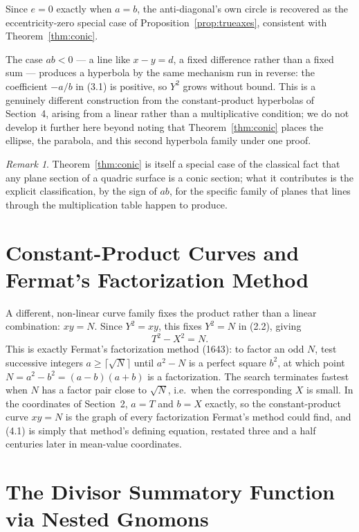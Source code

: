 \documentclass[11pt]{amsart}
\theoremstyle{remark}
\newtheorem*{remark}{Remark}
\begin{document}
Since $e=0$ exactly when $a=b$, the anti-diagonal's own circle is recovered as the eccentricity-zero special case of Proposition~\ref{prop:trueaxes}, consistent with Theorem~\ref{thm:conic}.

The case $ab<0$ --- a line like $x-y=d$, a fixed difference rather than a fixed sum --- produces a hyperbola by the same mechanism run in reverse: the coefficient $-a/b$ in (3.1) is positive, so $Y^2$ grows without bound. This is a genuinely different construction from the constant-product hyperbolas of Section~4, arising from a linear rather than a multiplicative condition; we do not develop it further here beyond noting that Theorem~\ref{thm:conic} places the ellipse, the parabola, and this second hyperbola family under one proof.

\begin{remark}
Theorem~\ref{thm:conic} is itself a special case of the classical fact that any plane section of a quadric surface is a conic section; what it contributes is the explicit classification, by the sign of $ab$, for the specific family of planes that lines through the multiplication table happen to produce.
\end{remark}

\section{Constant-Product Curves and Fermat's Factorization Method}

A different, non-linear curve family fixes the product rather than a linear combination: $xy=N$. Since $Y^2=xy$, this fixes $Y^2=N$ in (2.2), giving
\begin{equation}
T^2-X^2=N. \tag{4.1}
\end{equation}
This is exactly Fermat's factorization method (1643): to factor an odd $N$, test successive integers $a\ge\lceil\sqrt N\rceil$ until $a^2-N$ is a perfect square $b^2$, at which point $N=a^2-b^2=(a-b)(a+b)$ is a factorization. The search terminates fastest when $N$ has a factor pair close to $\sqrt N$, i.e.\ when the corresponding $X$ is small. In the coordinates of Section~2, $a=T$ and $b=X$ exactly, so the constant-product curve $xy=N$ is the graph of every factorization Fermat's method could find, and (4.1) is simply that method's defining equation, restated three and a half centuries later in mean-value coordinates.

\section{The Divisor Summatory Function via Nested Gnomons}
\end{document}
